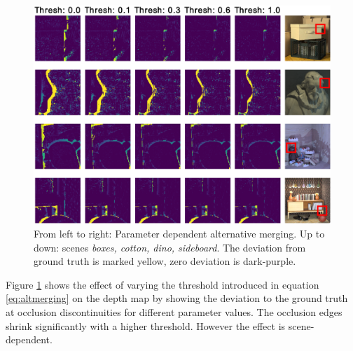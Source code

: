 \documentclass  [
  paper    = a4,
  BCOR     = 10mm,
  twoside,
  fontsize = 12pt,
  fleqn,
  toc      = bibnumbered,
  toc      = listofnumbered,
  numbers  = noendperiod,
  headings = normal,
  listof   = leveldown,
  version  = 3.03
]                                       {scrreprt}
\begin{document}
\begin{figure}
	\centering
	\includegraphics[width=1\linewidth]{images/choose_lower_difference}
	\caption[Alternative Merging:Parameter dependence]{From left to right: Parameter dependent alternative merging. Up to down: scenes \textit{boxes, cotton, dino, sideboard}. The deviation from ground truth is marked yellow, zero deviation is dark-purple.}
	\label{fig:chooselowerdifference-eps-converted-to}
\end{figure}

 Figure \ref{fig:chooselowerdifference-eps-converted-to} shows the effect of varying the threshold introduced in equation \ref{eq:altmerging} on the depth map by showing the deviation to the ground truth at occlusion discontinuities for different parameter values. The occlusion edges shrink significantly with a higher threshold. However the effect is scene-dependent.
\end{document}
